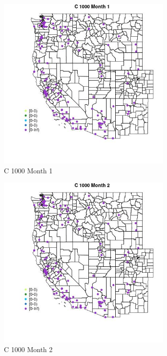 \begin{figure} 
\centering  
\includegraphics[width=0.77\textwidth]{Code_Outputs/Report_ML_input_PM25_Step4_part_e_de_duplicated_aves_MapObsMo1C_1000.jpg} 
\caption{\label{fig:Report_ML_input_PM25_Step4_part_e_de_duplicated_avesMapObsMo1C_1000}C 1000 Month 1} 
\end{figure} 
 

\begin{figure} 
\centering  
\includegraphics[width=0.77\textwidth]{Code_Outputs/Report_ML_input_PM25_Step4_part_e_de_duplicated_aves_MapObsMo2C_1000.jpg} 
\caption{\label{fig:Report_ML_input_PM25_Step4_part_e_de_duplicated_avesMapObsMo2C_1000}C 1000 Month 2} 
\end{figure} 
 


